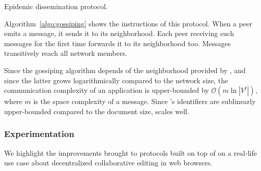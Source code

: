 \begin{algorithm}[h]
  
  \caption{\label{algo:gossiping}Epidemic dissemination protocol.}
\end{algorithm}

Algorithm~\ref{algo:gossiping} shows the instructions of this protocol. When a
peer emits a message, it sends it to its neighborhood. Each peer receiving such
messages for the first time forwards it to its neighborhood too. Messages
transitively reach all network members.

Since the gossiping algorithm depends of the neighborhood provided by \SPRAY,
and since the latter grows logarithmically compared to the network size, the
communication complexity of an application is upper-bounded by
$\mathcal{O}(m \ln |V^t|)$, where $m$ is the space complexity of a
message. Since \CRATE's identifiers are sublinearly upper-bounded compared to
the document size, \CRATE scales well.


\subsubsection{Experimentation}
\label{subsec:experiments2}

We highlight the improvements brought to protocols built on top of \SPRAY on a
real-life use case about decentralized collaborative editing in web browsers.



